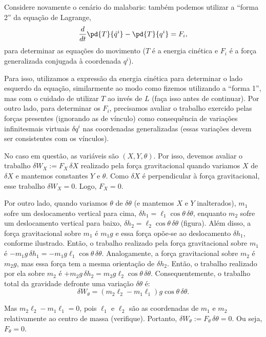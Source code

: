 \begin{question}
  	Considere novamente o cenário do malabaris: também podemos utilizar a ``forma 2'' da equação de Lagrange,
  	\begin{equation*}
  		\frac{d}{dt}\pd{T}{\dot q^i} - \pd{T}{q^i} = F_i,
  	\end{equation*}
  	para determinar as equações do movimento ($T$ é a energia cinética e $F_i$ é a força generalizada conjugada à coordenada $q^i$).

  	Para isso, utilizamos a expressão da energia cinética para determinar o lado esquerdo da equação, similarmente ao modo como fizemos utilizando a ``forma 1'', mas com o cuidado de utilizar $T$ ao invés de $L$ (faça isso antes de continuar).
  	Por outro lado, para determinar os $F_i$, precisamos avaliar o trabalho exercido pelas forças presentes (ignorando as de vínculo) como consequência de variações infinitesmais virtuais $\delta q^i$ nas coordenadas generalizadas (essas variações devem ser consistentes com os vínculos).

  	No caso em questão, as variáveis são $(X, Y, \theta)$.
  	Por isso, devemos avaliar o trabalho $\delta W_X := F_X \,\delta X$ realizado pela força gravitacional quando variamos $X$ de $\delta X$ e mantemos constantes $Y$ e $\theta$.
  	Como $\delta X$ é perpendicular à força gravitacional, esse trabalho $\delta W_X = 0$.
  	Logo, $F_X = 0$.

  	Por outro lado, quando variamos $\theta$ de $\delta\theta$ (e mantemos $X$ e $Y$ inalterados), $m_1$ sofre um deslocamento vertical para cima, $\delta h_1 = \ell_1 \cos\theta\,\delta\theta$, enquanto $m_2$ sofre um deslocamento vertical para baixo, $\delta h_2 = \ell_2 \cos\theta\,\delta\theta$ (figura).
  	Além disso, a força gravitacional sobre $m_1$ é $m_1g$ e essa força opõe-se ao deslocamento $\delta h_1$, conforme ilustrado.
  	Então, o trabalho realizado pela força gravitacional sobre $m_1$ é $-m_1g\,\delta h_1 = -m_1g\ell_1 \cos\theta\,\delta\theta$.
  	Analogamente, a força gravitacional sobre $m_2$ é $m_2g$, mas essa força tem a mesma orientação de $\delta h_2$.
  	Então, o trabalho realizado por ela sobre $m_2$ é $+m_2g\,\delta h_2 = m_2g\ell_2 \cos\theta\,\delta\theta$.
  	Consequentemente, o trabalho total da gravidade defronte uma variação $\delta\theta$ é:
  	\begin{equation*}
  		\delta W_\theta = (m_2\ell_2 - m_1\ell_1)g \cos\theta\,\delta\theta.
  	\end{equation*}

  	Mas $m_2\ell_2 - m_1\ell_1 = 0$, pois $\ell_1$ e $\ell_2$ são as coordenadas de $m_1$ e $m_2$ relativamente ao centro de massa (verifique).
  	Portanto, $\delta W_\theta := F_\theta \,\delta\theta = 0$.
  	Ou seja, $F_\theta = 0$.


\end{question}
